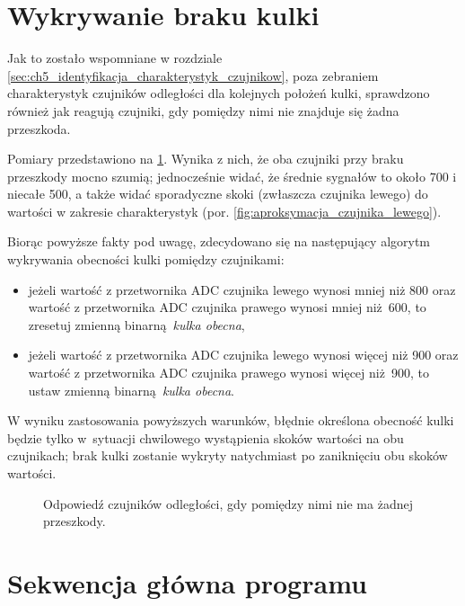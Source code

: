 \section{Wykrywanie braku kulki}
\label{sec:ch7_wykrywanie_braku_kulki}

Jak to zostało wspomniane w rozdziale \ref{sec:ch5_identyfikacja_charakterystyk_czujnikow}, poza zebraniem charakterystyk czujników odległości dla kolejnych położeń kulki, sprawdzono również jak reagują czujniki, gdy pomiędzy nimi nie znajduje się żadna przeszkoda.

Pomiary przedstawiono na \cref{fig:czujniki_charakterystyka_bez_przeszkody}. Wynika z nich, że oba czujniki przy braku przeszkody mocno szumią; jednocześnie widać, że średnie sygnałów to około \num{700} i niecałe \num{500}, a także widać sporadyczne skoki (zwłaszcza czujnika lewego) do wartości w zakresie charakterystyk (por. \cref{fig:aproksymacja_czujnika_lewego}).

Biorąc powyższe fakty pod uwagę, zdecydowano się na następujący algorytm wykrywania obecności kulki pomiędzy czujnikami:
\begin{itemize}
    \item jeżeli wartość z przetwornika ADC czujnika lewego wynosi mniej niż \num{800} oraz wartość z przetwornika ADC czujnika prawego wynosi mniej niż \num{600}, to zresetuj zmienną binarną \textit{kulka obecna},
    \item jeżeli wartość z przetwornika ADC czujnika lewego wynosi więcej niż \num{900} oraz wartość z przetwornika ADC czujnika prawego wynosi więcej niż \num{900}, to ustaw zmienną binarną \textit{kulka obecna}.
\end{itemize}

W wyniku zastosowania powyższych warunków, błędnie określona obecność kulki będzie tylko w~sytuacji chwilowego wystąpienia skoków wartości na obu czujnikach; brak kulki zostanie wykryty natychmiast po zaniknięciu obu skoków wartości.

\begin{figure}[ht]
    \centering
        
    \caption{Odpowiedź czujników odległości, gdy pomiędzy nimi nie ma żadnej przeszkody.}
    \label{fig:czujniki_charakterystyka_bez_przeszkody}
\end{figure}

\section{Sekwencja główna programu}
\label{sec:sekwencja_glowna}

